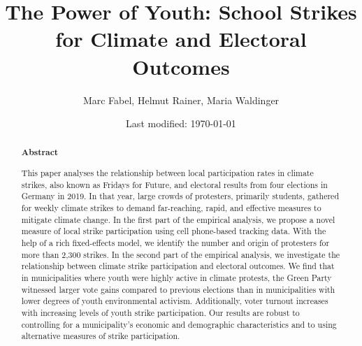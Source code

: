 \documentclass[11pt, a4paper]{article} %
\title{The Power of Youth: School Strikes for Climate and Electoral Outcomes}
\author{Marc Fabel, Helmut Rainer, Maria Waldinger} %
\date{Last modified: \today}
\begin{document}
\setcounter{page}{0}  
\maketitle


\vspace{-4 em}
\renewcommand{\abstractname}{\vspace{-\baselineskip}} %

\begin{abstract}\noindent 
	\footnotesize{\begin{center}\textbf{Abstract}\end{center} This paper analyses the relationship between local participation rates in climate strikes, also known as Fridays for Future, and electoral results from four elections in Germany in 2019. In that year, large crowds of protesters, primarily students, gathered for weekly climate strikes to demand far-reaching, rapid, and effective measures to mitigate climate change. In the first part of the empirical analysis, we propose a novel measure of local strike participation using cell phone-based tracking data. With the help of a rich fixed-effects model, we identify the number and origin of protesters for more than 2,300 strikes. In the second part of the empirical analysis, we investigate the relationship between climate strike participation and electoral outcomes. We find that in municipalities where youth were highly active in climate protests, the Green Party witnessed larger vote gains compared to previous elections than in municipalities with lower degrees of youth environmental activism. Additionally, voter turnout increases with increasing levels of youth strike participation. Our results are robust to controlling for a municipality's economic and demographic characteristics and to using alternative measures of strike participation.}
\end{abstract}




 




\newpage



\end{document}
